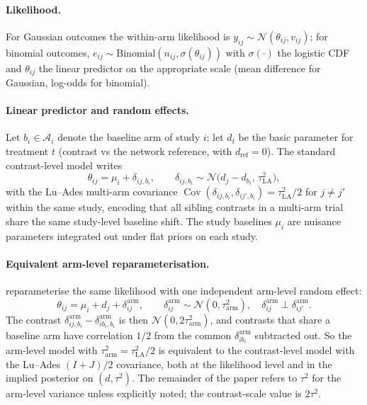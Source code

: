 \documentclass[12pt]{article}
\newcommand{\Cov}{\operatorname{Cov}}
\begin{document}
\paragraph{Likelihood.}
For Gaussian outcomes the within-arm likelihood is
$y_{ij} \sim \mathcal{N}(\theta_{ij}, v_{ij})$; for binomial
outcomes,
$e_{ij} \sim \text{Binomial}(n_{ij}, \sigma(\theta_{ij}))$
with $\sigma(\cdot)$ the logistic CDF and $\theta_{ij}$ the
linear predictor on the appropriate scale (mean difference for
Gaussian, log-odds for binomial).

\paragraph{Linear predictor and random effects.}
Let $b_i \in \mathcal{A}_i$ denote the baseline arm of study
$i$; let $d_t$ be the basic parameter for treatment $t$
(contrast vs the network reference, with $d_{\text{ref}} = 0$).
The standard contrast-level model writes
\begin{equation}
\theta_{ij} = \mu_i + \delta_{ij,b_i},
\qquad
\delta_{ij,b_i}
\sim \mathcal{N}\!\bigl(d_j - d_{b_i},\, \tau^2_{\text{LA}}\bigr),
\label{eq:contrast-model}
\end{equation}
with the Lu--Ades multi-arm covariance
$\Cov(\delta_{ij,b_i}, \delta_{ij',b_i})
= \tau^2_{\text{LA}}/2$ for $j \ne j'$ within the same study,
encoding that all sibling contrasts in a multi-arm trial share
the same study-level baseline shift. The study baselines $\mu_i$
are nuisance parameters integrated out under flat priors on each
study.

\paragraph{Equivalent arm-level reparameterisation.}
\citet{papakonstantinou2025spring} reparameterise the same
likelihood with one independent arm-level random effect:
\begin{equation}
\theta_{ij} = \mu_i + d_j + \delta_{ij}^{\text{arm}},
\qquad
\delta_{ij}^{\text{arm}}
\sim \mathcal{N}(0, \tau^2_{\text{arm}}),
\quad
\delta_{ij}^{\text{arm}}
\perp \delta_{ij'}^{\text{arm}}.
\label{eq:arm-model}
\end{equation}
The contrast $\delta_{ij,b_i}^{\text{arm}}
- \delta_{ib_i,b_i}^{\text{arm}}$ is then
$\mathcal{N}(0, 2\tau^2_{\text{arm}})$, and contrasts that share
a baseline arm have correlation $1/2$ from the common
$\delta_{ib_i}^{\text{arm}}$ subtracted out. So the
arm-level model with $\tau^2_{\text{arm}} = \tau^2_{\text{LA}}/2$
is equivalent to the contrast-level model with the Lu--Ades
$(I + J)/2$ covariance, both at the likelihood level and in the
implied posterior on $(d, \tau^2)$. The remainder of the paper
refers to $\tau^2$ for the arm-level variance unless explicitly
noted; the contrast-scale value is $2\tau^2$.
\end{document}
